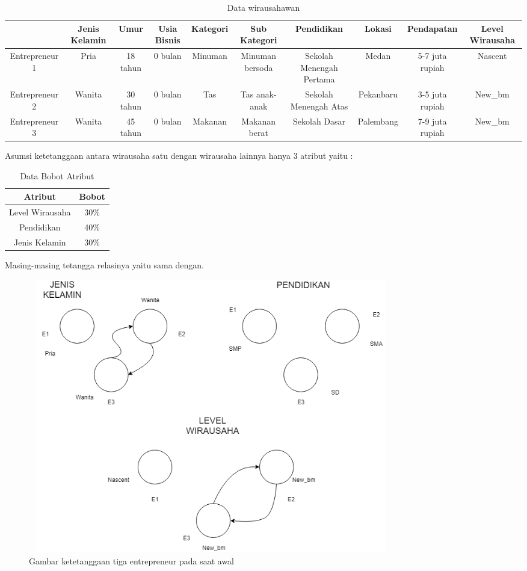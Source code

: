 \begin{table} [H]
\centering
\caption{Data wirausahawan}
\begin{tabular}{|c|c|c|c|c|c|c|c|c|c|}
\hline
& Jenis Kelamin & Umur & Usia Bisnis & Kategori & Sub Kategori & Pendidikan & Lokasi & Pendapatan & Level Wirausaha\\
\hline
Entrepreneur 1 & Pria & 18 tahun & 0 bulan & Minuman & Minuman bersoda & Sekolah Menengah Pertama & Medan & 5-7 juta rupiah & Nascent\\
\hline
Entrepreneur 2 & Wanita & 30 tahun & 0 bulan & Tas & Tas anak-anak  & Sekolah Menengah Atas & Pekanbaru & 3-5 juta rupiah & New\_bm\\
\hline
Entrepreneur 3 & Wanita & 45 tahun & 0 bulan & Makanan & Makanan berat & Sekolah Dasar & Palembang & 7-9 juta rupiah & New\_bm\\
\hline
\end{tabular}
\end{table}

Asumsi ketetanggaan antara wirausaha satu dengan wirausaha lainnya hanya 3 atribut yaitu :

\begin{table} [H]
\centering
\caption{Data Bobot Atribut}
\begin{tabular}{|c|c|}
\hline
Atribut & Bobot\\
\hline
Level Wirausaha & 30\% \\
\hline
Pendidikan & 40\% \\
\hline
Jenis Kelamin & 30\% \\
\hline
\end{tabular}
\end{table}

Masing-masing tetangga relasinya yaitu sama dengan.

	\begin{figure} [H]
		\centering  
		\includegraphics[width=16cm, height=12cm]{t=0} 
		\caption[Gambar ketetanggaan tiga entrepreneur pada saat awal]{Gambar ketetanggaan tiga entrepreneur pada saat awal} 
		\label{fig:t0} 
	\end{figure}


